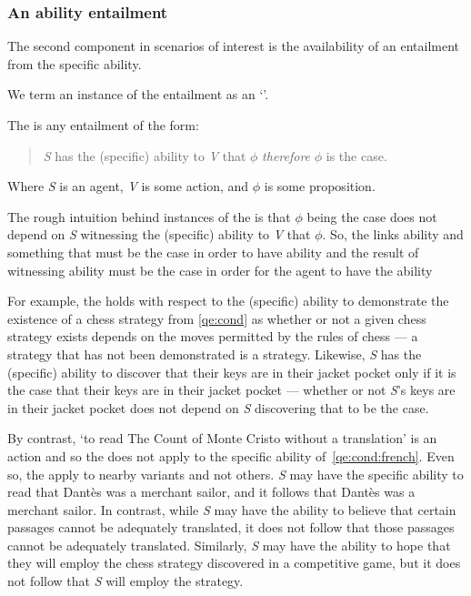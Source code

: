 \subsubsection{An ability entailment}
\label{sec:ability-entailment}

\begin{note}[\aben{}]
  The second component in scenarios of interest is the availability of an entailment from the specific ability.

  We term an instance of the entailment as an `\aben{}'.

  \begin{definition}
    The \aben{} is any entailment of the form:
    \begin{quote}
      \emph{S} has the (specific) ability to \emph{V} that \(\phi\) \emph{therefore} \(\phi\) is the case.
    \end{quote}
    Where \emph{S} is an agent, \emph{V} is some action, and \(\phi\) is some proposition.
  \end{definition}

  The rough intuition behind instances of the \aben{} is that \(\phi\) being the case does not depend on \emph{S} witnessing the (specific) ability to \emph{V} that \(\phi\).
  So, the \aben{} links ability and something that must be the case in order to have ability and the result of witnessing ability must be the case in order for the agent to have the ability

  For example, the \aben{} holds with respect to the (specific) ability to demonstrate the existence of a chess strategy from \ref{qe:cond} as whether or not a given chess strategy exists depends on the moves permitted by the rules of chess --- a strategy that has not been demonstrated is a strategy.
  Likewise, \emph{S} has the (specific) ability to discover that their keys are in their jacket pocket only if it is the case that their keys are in their jacket pocket --- whether or not \emph{S}'s keys are in their jacket pocket does not depend on \emph{S} discovering that to be the case.

  By contrast, `to read The Count of Monte Cristo without a translation' is an action and so the \aben{} does not apply to the specific ability of~\ref{qe:cond:french}.
  Even so, the \aben{} apply to nearby variants and not others.
  \emph{S} may have the specific ability to read that Dantès was a merchant sailor, and it follows that Dantès was a merchant sailor.
  In contrast, while \emph{S} may have the ability to believe that certain passages cannot be adequately translated, it does not follow that those passages cannot be adequately translated.
  Similarly, \emph{S} may have the ability to hope that they will employ the chess strategy discovered in a competitive game, but it does not follow that \emph{S} will employ the strategy.


\end{note}
